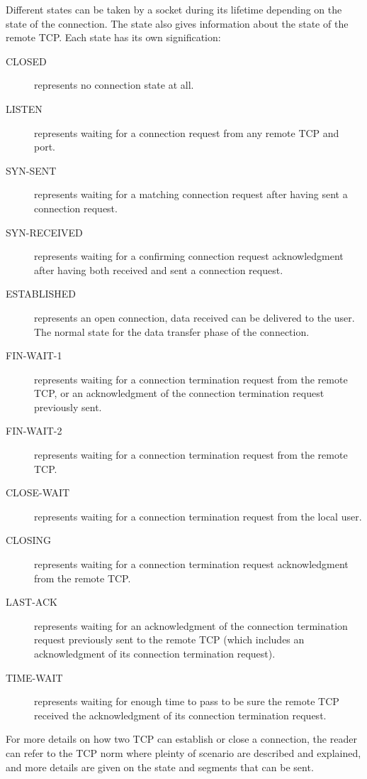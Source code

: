 \documentclass[a4paper, 10pt]{article}
\begin{document}
    Different states can be taken by a socket during its lifetime depending on the state
    of the connection. The state also gives information about the state of the remote TCP.
    Each state has its own signification:
    \begin{description}
        \item[CLOSED] represents no connection state at all.
        \item[LISTEN] represents waiting for a connection request from any remote
        TCP and port.
        \item[SYN-SENT] represents waiting for a matching connection request
        after having sent a connection request.
        \item[SYN-RECEIVED] represents waiting for a confirming connection
        request acknowledgment after having both received and sent a
        connection request.
        \item[ESTABLISHED] represents an open connection, data received can be
        delivered to the user. The normal state for the data transfer phase
        of the connection.
        \item[FIN-WAIT-1] represents waiting for a connection termination request
        from the remote TCP, or an acknowledgment of the connection
        termination request previously sent.
        \item[FIN-WAIT-2] represents waiting for a connection termination request
        from the remote TCP.
        \item[CLOSE-WAIT] represents waiting for a connection termination request
        from the local user.
        \item[CLOSING] represents waiting for a connection termination request
        acknowledgment from the remote TCP.
        \item[LAST-ACK] represents waiting for an acknowledgment of the
        connection termination request previously sent to the remote TCP
        (which includes an acknowledgment of its connection termination
        request).
        \item[TIME-WAIT] represents waiting for enough time to pass to be sure
        the remote TCP received the acknowledgment of its connection
        termination request.
    \end{description}

    For more details on how two TCP can establish or close a connection, the reader can refer
    to the TCP norm where pleinty of scenario are described and explained, and more
    details are given on the state and segments that can be sent.
\end{document}
